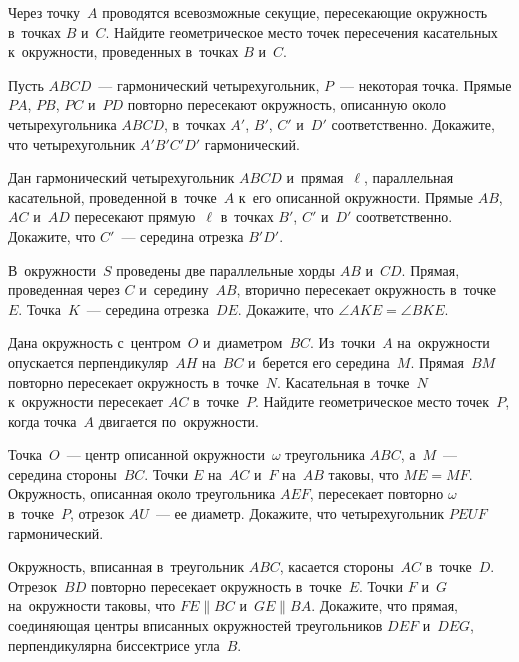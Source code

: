 


\begin{problems}

\item
Через точку~$A$ проводятся всевозможные секущие, пересекающие окружность
в~точках $B$ и~$C$.
Найдите геометрическое место точек пересечения касательных к~окружности,
проведенных в~точках $B$ и~$C$.

\item
Пусть $ABCD$~--- гармонический четырехугольник, $P$~--- некоторая точка.
Прямые $PA$, $PB$, $PC$ и~$PD$ повторно пересекают окружность, описанную
около четырехугольника $ABCD$, в~точках $A'$, $B'$, $C'$ и~$D'$ соответственно.
Докажите, что четырехугольник $A'B'C'D'$ гармонический.

\item
Дан гармонический четырехугольник $ABCD$ и~прямая~$\ell$, параллельная
касательной, проведенной в~точке~$A$ к~его описанной окружности.
Прямые $AB$, $AC$ и~$AD$ пересекают прямую~$\ell$ в~точках $B'$, $C'$ и~$D'$
соответственно.
Докажите, что $C'$~--- середина отрезка $B'D'$.

\item
В~окружности~$S$ проведены две параллельные хорды $AB$ и~$CD$.
Прямая, проведенная через $C$ и~середину~$AB$, вторично пересекает окружность
в~точке~$E$.
Точка~$K$~--- середина отрезка~$DE$.
Докажите, что $\angle AKE = \angle BKE$.

\item
Дана окружность с~центром~$O$ и~диаметром~$BC$.
Из~точки~$A$ на~окружности опускается перпендикуляр~$AH$ на~$BC$ и~берется его
середина~$M$.
Прямая~$BM$ повторно пересекает окружность в~точке~$N$.
Касательная в~точке~$N$ к~окружности пересекает $AC$ в~точке~$P$.
Найдите геометрическое место точек~$P$, когда точка~$A$ двигается
по~окружности.

\item
Точка~$O$~--- центр описанной окружности~$\omega$ треугольника $ABC$, а~$M$~---
середина стороны~$BC$.
Точки $E$ на~$AC$ и~$F$ на~$AB$ таковы, что $ME = MF$.
Окружность, описанная около треугольника $AEF$, пересекает повторно $\omega$
в~точке~$P$, отрезок $AU$~--- ее диаметр.
Докажите, что четырехугольник $PEUF$ гармонический.

\item
Окружность, вписанная в~треугольник $ABC$, касается стороны~$AC$ в~точке~$D$.
Отрезок~$BD$ повторно пересекает окружность в~точке~$E$.
Точки $F$ и~$G$ на~окружности таковы, что $FE \parallel BC$
и~$GE \parallel BA$.
Докажите, что прямая, соединяющая центры вписанных окружностей треугольников
$DEF$ и~$DEG$, перпендикулярна биссектрисе угла~$B$.


\end{problems}
